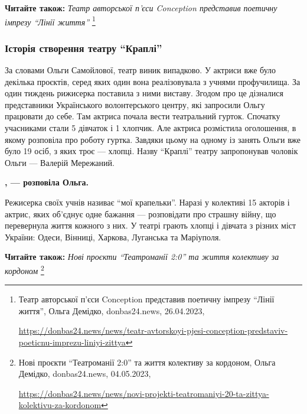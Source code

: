 \textbf{Читайте також:} \emph{Театр авторської п'єси Conception представив поетичну імпрезу \enquote{Лінії життя}}%
\footnote{Театр авторської п'єси Conception представив поетичну імпрезу \enquote{Лінії життя}, Ольга Демідко, donbas24.news, 26.04.2023, \par%
\url{https://donbas24.news/news/teatr-avtorskoyi-pjesi-conception-predstaviv-poeticnu-imprezu-liniyi-zittya}%
}

\subsubsection{Історія створення театру \enquote{Краплі}}

За словами Ольги Самойлової, театр виник випадково. У актриси вже було декілька
проєктів, серед яких один вона реалізовувала з учнями профучилища. За один
тиждень рижисерка поставила з ними виставу. Згодом про це дізналися
представники Українського волонтерського центру, які запросили Ольгу працювати
до себе. Там актриса почала вести театральний гурток. Спочатку учасниками стали
5 дівчаток і 1 хлопчик. Але актриса розмістила оголошення, в якому розповіла
про роботу гуртка. Завдяки цьому на одному із занять Ольги вже було 19 осіб, з
яких троє — хлопці. Назву \enquote{Краплі} театру запропонував чоловік Ольги —
Валерій Мережаний.

\begin{leftbar}
	\begingroup
		\bfseries
{}, — розповіла Ольга.
	\endgroup
\end{leftbar}

Режисерка своїх учнів називає \enquote{мої крапельки}. Наразі у колективі 15
акторів і актрис, яких об'єднує одне бажання — розповідати про страшну війну,
що перевернула життя кожного з них. У театрі грають хлопці і дівчата з різних
міст України: Одеси, Вінниці, Харкова, Луганська та Маріуполя. 

\textbf{Читайте також:} \emph{Нові проєкти \enquote{Театроманії 2:0} та життя колективу за кордоном}%
\footnote{Нові проєкти \enquote{Театроманії 2:0} та життя колективу за кордоном, Ольга Демідко, donbas24.news, 04.05.2023, \par%
\url{https://donbas24.news/news/novi-projekti-teatromaniyi-20-ta-zittya-kolektivu-za-kordonom}%
}


